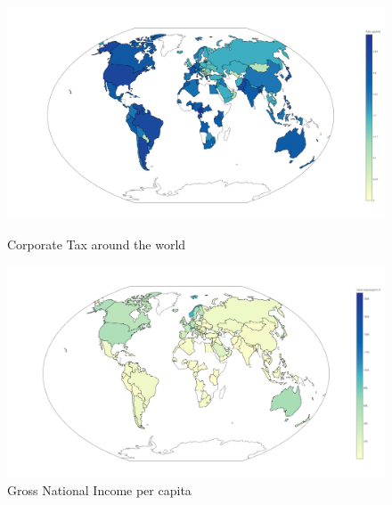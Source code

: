 \documentclass{article}
\begin{document}
\begin{figure}[ht]
\centering
\begin{minipage}{.5\textwidth}
  \centering
  \includegraphics[width=1\linewidth]{Images/CTworld.png}
  \caption{Corporate Tax around the world}
  \label{fig:test1}
\end{minipage}%
\begin{minipage}{.5\textwidth}
  \centering
  \includegraphics[width=1\linewidth]{Images/GNIworld.png}
  \caption{Gross National Income per capita}
  \label{fig:test2}
\end{minipage}
\end{figure}
\end{document}
